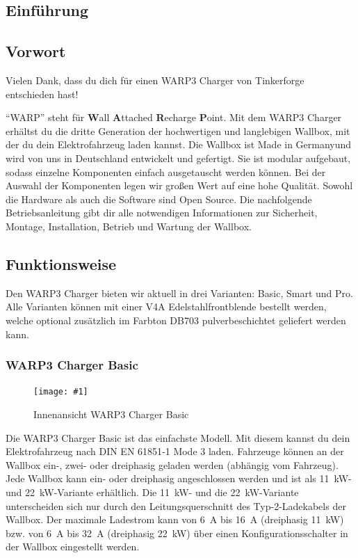 \documentclass[a4paper,10pt]{article}
\newcommand{\gfx}[1]{\texttt{[image: \#1]}}
\begin{document}
\begin{multicols*}{2}
    \tableofcontents
    \newpage
    \section{Einführung}
    \subsection{Vorwort} Vielen Dank, dass du
    dich für einen WARP3 Charger von Tinkerforge entschieden hast!

    \enquote{WARP} steht
    für \textbf{W}all \textbf{A}ttached
    \textbf{R}echarge \textbf{P}oint. Mit dem WARP3 Charger
    erhältst du die dritte Generation der hochwertigen und langlebigen Wallbox,
    mit der du dein Elektrofahrzeug laden kannst.
    Die Wallbox ist \glqq Made in Germany\grqq und wird von uns in 
	Deutschland entwickelt und gefertigt. Sie ist modular aufgebaut, sodass
    einzelne Komponenten einfach ausgetauscht werden können. Bei der Auswahl der
	Komponenten legen wir großen Wert auf eine hohe Qualität. Sowohl die Hardware als
    auch die Software sind Open Source. Die nachfolgende Betriebsanleitung gibt dir
    alle notwendigen Informationen zur Sicherheit, Montage, Installation, Betrieb
    und Wartung der Wallbox.

    \subsection{Funktionsweise}
    \vspace{-0.1cm}
    Den WARP3 Charger bieten wir aktuell in drei Varianten: Basic, Smart und Pro.
	Alle Varianten können mit einer V4A Edelstahlfrontblende bestellt werden,
	welche optional zusätzlich im Farbton DB703 pulverbeschichtet geliefert
	werden kann.

	\subsubsection*{WARP3 Charger Basic}
    \begin{figure}[H]
        \gfx{./img_warp3/resized/warp3_basic_open}
        \caption*{Innenansicht WARP3 Charger Basic}
    \end{figure}
    Die WARP3 Charger Basic ist das einfachste Modell. Mit diesem kannst du dein
    Elektrofahrzeug nach DIN EN 61851‐1 Mode 3 laden.
    Fahrzeuge können an der Wallbox ein-, zwei- oder dreiphasig geladen werden
    (abhängig vom Fahrzeug). Jede Wallbox kann ein- oder dreiphasig
    angeschlossen werden und ist als \SI{11}{\kilo\watt}- und
    \SI{22}{\kilo\watt}-Variante erhältlich. Die \SI{11}{\kilo\watt}- und
    die \SI{22}{\kilo\watt}-Variante unterscheiden sich nur durch den
    Leitungsquerschnitt des Typ-2-Ladekabels der Wallbox. Der maximale Ladestrom
    kann von \SI{6}{\ampere} bis \SI{16}{\ampere}
    (dreiphasig \SI{11}{\kilo\watt}) bzw. von \SI{6}{\ampere} bis \SI{32}{\ampere} (dreiphasig \SI{22}{\kilo\watt}) über
	einen Konfigurationsschalter in der Wallbox eingestellt werden.


\end{multicols*}
\end{document}
